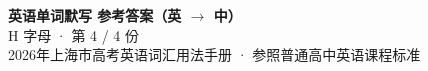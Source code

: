 \documentclass[10pt,a4paper]{article}
\begin{document}
\pagestyle{plain}

\begin{center}
{\LARGE\bfseries 英语单词默写 \quad 参考答案（英 $\to$ 中）}\\[0.22em]
{\large H 字母 · 第 4 / 4 份}\\[0.18em]
{\small 2026年上海市高考英语词汇用法手册 · 参照普通高中英语课程标准}
\end{center}

\vspace{0.2em}
\noindent{\color{rulegray}\rule{\textwidth}{0.8pt}}

\vspace{0.35em}

\vspace{0.25em}
\renewcommand{\arraystretch}{1.32}
\end{document}
